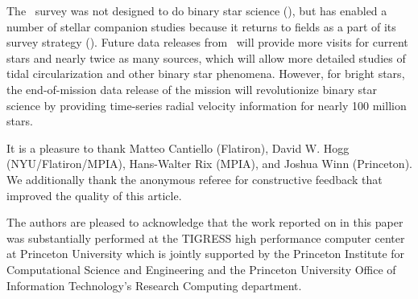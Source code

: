 \documentclass[modern, letterpaper]{aastex62}
\newcommand{\apogee}{\project{\acronym{APOGEE}}}
\newcommand{\sdssiv}{\project{\acronym{SDSS-IV}}}
\begin{document}
The \apogee\ survey was not designed to do binary star science
(\citealt{Majewski:2017}), but has enabled a number of stellar companion studies
because it returns to fields as a part of its survey strategy
(\citealt{Troup:2016, Badenes:2018, Price-Whelan:2018}).
Future data releases from \apogee\ will provide more visits for current stars
and nearly twice as many sources, which will allow more detailed studies of
tidal circularization and other binary star phenomena.
However, for bright stars, the end-of-mission data release of the 
mission will revolutionize binary star science by providing time-series radial
velocity information for nearly 100 million stars.

\acknowledgements

It is a pleasure to thank
Matteo Cantiello (Flatiron),
David W. Hogg (NYU/Flatiron/MPIA),
Hans-Walter Rix (MPIA),
and Joshua Winn (Princeton).
We additionally thank the anonymous referee for constructive feedback that improved the quality of this article.

The authors are pleased to acknowledge that the work reported on in this paper was substantially performed at the TIGRESS high performance computer center at Princeton University which is jointly supported by the Princeton Institute for Computational Science and Engineering and the Princeton University Office of Information Technology's Research Computing department.


\facility{\sdssiv, \apogee}



\end{document}
